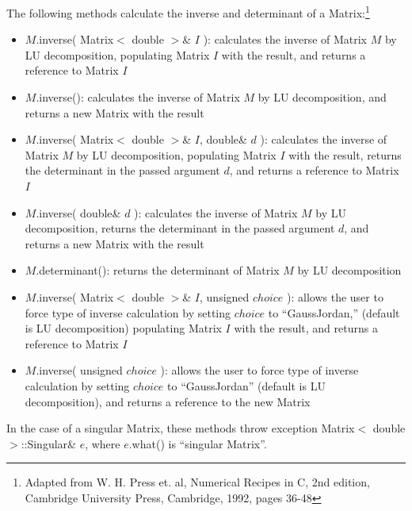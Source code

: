 \documentclass{report}
\begin{document}
The following methods calculate the inverse and determinant of a
Matrix:\footnote{Adapted from W. H. Press et. al, Numerical
Recipes in C, 2nd edition, Cambridge University Press, Cambridge,
1992, pages 36-48}

\begin{itemize}
\item $M$.inverse( Matrix$<$ double $>$\& $I$ ): calculates the
      inverse of Matrix $M$ by LU decomposition, populating Matrix $I$
      with the result, and returns a reference to Matrix $I$
\item $M$.inverse(): calculates the inverse of Matrix $M$ by LU
      decomposition, and returns a new Matrix with the result
\item $M$.inverse( Matrix$<$ double $>$\& $I$, double\& $d$ ):
      calculates the inverse of Matrix $M$ by LU decomposition,
      populating Matrix $I$ with the result, returns the determinant
      in the passed argument $d$, and returns a reference to Matrix
      $I$
\item $M$.inverse( double\& $d$ ): calculates the inverse of Matrix
      $M$ by LU decomposition, returns the determinant in the passed
      argument $d$, and returns a new Matrix with the result
\item $M$.determinant(): returns the determinant of Matrix $M$ by LU
      decomposition
\item $M$.inverse( Matrix$<$ double $>$\& $I$, unsigned $choice$ ):
      allows the user to force type of inverse calculation by setting
      $choice$ to ``GaussJordan,'' (default is LU decomposition)
      populating Matrix $I$ with the result, and returns a reference
      to Matrix $I$
\item $M$.inverse( unsigned $choice$ ): allows the user to force type
      of inverse calculation by setting $choice$ to ``GaussJordan''
      (default is LU decomposition), and returns a reference to the
      new Matrix
\end{itemize}

In the case of a singular Matrix, these methods throw exception
Matrix$<$ double $>$::Singular\& $e$, where $e$.what() is ``singular
Matrix''.
\end{document}
